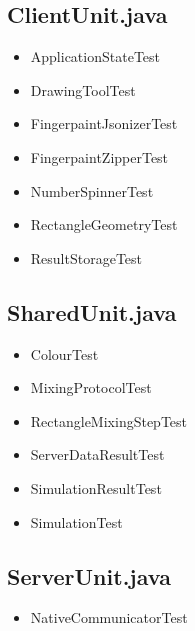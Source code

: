 \subsection{ClientUnit.java}
\begin{itemize}
\item 	ApplicationStateTest
\item 	DrawingToolTest
\item 	FingerpaintJsonizerTest
\item 	FingerpaintZipperTest
\item 	NumberSpinnerTest
\item 	RectangleGeometryTest
\item 	ResultStorageTest
\end{itemize}

\subsection{SharedUnit.java}
\begin{itemize}
\item 	ColourTest
\item	MixingProtocolTest
\item	RectangleMixingStepTest
\item 	ServerDataResultTest
\item	SimulationResultTest
\item	SimulationTest
\end{itemize}

\subsection{ServerUnit.java}
\begin{itemize}
\item NativeCommunicatorTest
\end{itemize}